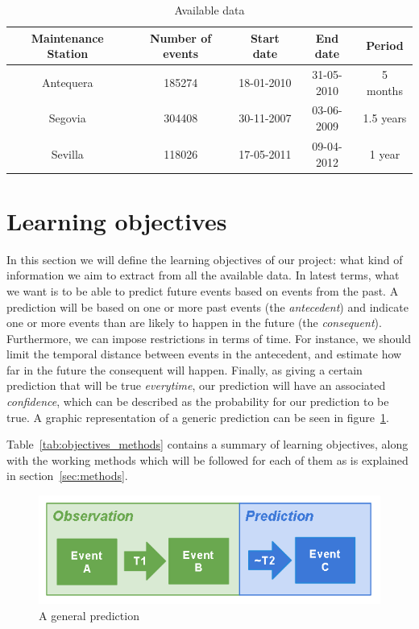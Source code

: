 \documentclass[a4paper,12pt]{article}
\begin{document}
\begin{table}
\begin{center}
\begin{tabular}{|c|c|c|c|c|}
\hline Maintenance Station & Number of events & Start date & End date & Period \\ 
\hline Antequera & 185274 & 18-01-2010 & 31-05-2010 &  5 months \\ 
\hline Segovia & 304408 & 30-11-2007 & 03-06-2009 &  1.5 years \\ 
\hline Sevilla & 118026 & 17-05-2011 & 09-04-2012 &  1 year \\ 
\hline 
\end{tabular}
\end{center} 
\caption {Available data} \label{tab:data_details} 
\end{table}

\section{Learning objectives}
In this section we will define the learning objectives of our project: what kind of information we aim to extract from all the available data. In latest terms, what we want is to be able to predict future events based on events from the past. A prediction will be based on one or more past events (the \emph{antecedent}) and indicate one or more events than are likely to happen in the future (the \emph{consequent}). Furthermore, we can impose restrictions in terms of time. For instance, we should limit the temporal distance between events in the antecedent, and estimate how far in the future the consequent will happen. Finally, as giving a certain prediction that will be true \emph{everytime}, our prediction will have an associated \emph{confidence}, which can be described as the probability for our prediction to be true. A graphic representation of a generic prediction can be seen in figure~\ref{fig:ass_rule}.

Table~\ref{tab:objectives_methods} contains a summary of learning objectives, along with the working methods which will be followed for each of them as is explained in section~\ref{sec:methods}.

\begin{figure}[hbtp]
\includegraphics[width=\textwidth]{./img/association_rules.png}
\caption{A general prediction} \label{fig:ass_rule}
\end{figure}
\end{document}
